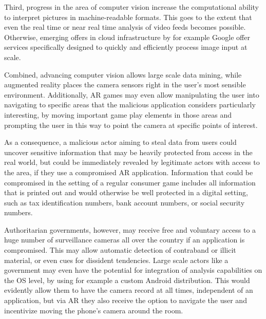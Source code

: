 Third, progress in the area of computer vision increase the computational ability to interpret pictures in machine-readable formats. This goes to the extent that even the real time or near real time analysis of video feeds becomes possible. Otherwise, emerging offers in cloud infrastructure by for example Google offer services specifically designed to quickly and efficiently process image input at scale.

Combined, advancing computer vision allows large scale data mining, while augmented reality places the camera sensors right in the user's most sensible environment.
Additionally, AR games may even allow manipulating the user into navigating to specific areas that the malicious application considers particularly interesting, by moving important game play elements in those areas and prompting the user in this way to point the camera at specific points of interest.

As a consequence, a malicious actor aiming to steal data from users could uncover sensitive information that may be heavily protected from access in the real world, but could be immediately revealed by legitimate actors with access to the area, if they use a compromised AR application.
Information that could be compromised in the setting of a regular consumer game includes all information that is printed out and would otherwise be well protected in a digital setting, such as tax identification numbers, bank account numbers, or social security numbers.

Authoritarian governments, however, may receive free and voluntary access to a huge number of surveillance cameras all over the country if an application is compromised. This may allow automatic detection of contraband or illicit material, or even cues for dissident tendencies. Large scale actors like a government may even have the potential for integration of analysis capabilities on the OS level, by using for example a custom Android distribution.
This would evidently allow them to have the camera record at all times, independent of an application, but via AR they also receive the option to navigate the user and incentivize moving the phone's camera around the room.

